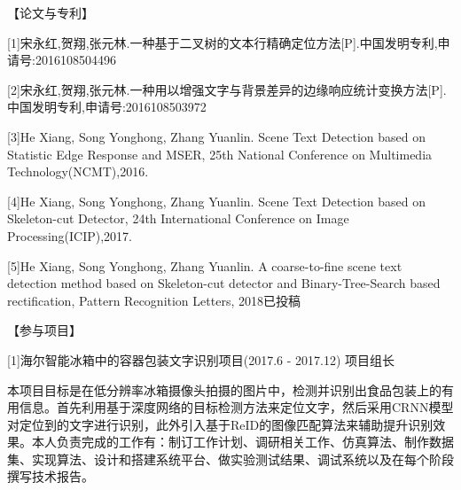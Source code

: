 ﻿%
%
%
%
%
%
【论文与专利】

[1]宋永红,贺翔,张元林.一种基于二叉树的文本行精确定位方法[P].中国发明专利,申请号:2016108504496

[2]宋永红,贺翔,张元林.一种用以增强文字与背景差异的边缘响应统计变换方法[P].中国发明专利,申请号:2016108503972

[3]He Xiang, Song Yonghong, Zhang Yuanlin. Scene Text Detection based on Statistic Edge Response and MSER, 25th National Conference on Multimedia Technology(NCMT),2016.

[4]He Xiang, Song Yonghong, Zhang Yuanlin. Scene Text Detection based on Skeleton-cut Detector, 24th International Conference on Image Processing(ICIP),2017.

[5]He Xiang, Song Yonghong, Zhang Yuanlin. A coarse-to-fine scene text detection method based on Skeleton-cut detector and Binary-Tree-Search based rectification, Pattern Recognition Letters, 2018已投稿



【参与项目】

[1]海尔智能冰箱中的容器包装文字识别项目(2017.6 - 2017.12) 项目组长

本项目目标是在低分辨率冰箱摄像头拍摄的图片中，检测并识别出食品包装上的有用信息。首先利用基于深度网络的目标检测方法来定位文字，然后采用CRNN模型对定位到的文字进行识别，此外引入基于ReID的图像匹配算法来辅助提升识别效果。本人负责完成的工作有：制订工作计划、调研相关工作、仿真算法、制作数据集、实现算法、设计和搭建系统平台、做实验测试结果、调试系统以及在每个阶段撰写技术报告。





